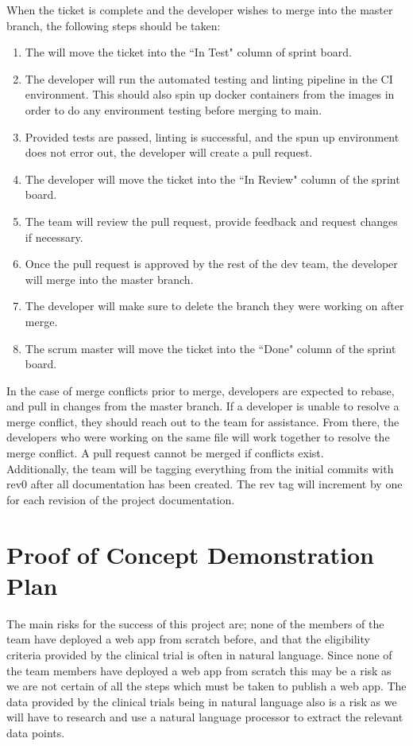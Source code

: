 \documentclass{article}
\begin{document}
When the ticket is complete and the developer wishes to merge into the master branch, the following steps should be taken:
\begin{enumerate}
	\item The will move the ticket into the ``In Test" column of sprint board.
	\item The developer will run the automated testing and linting pipeline in the CI environment.
	This should also spin up docker containers from the images in order to do any environment testing before merging to main.
	\item Provided tests are passed, linting is successful, and the spun up environment does not error out, the developer will create a pull request.
	\item The developer will move the ticket into the ``In Review" column of the sprint board.
	\item The team will review the pull request, provide feedback and request changes if necessary. 
	\item Once the pull request is approved by the rest of the dev team, the developer will merge into the master branch.
	\item The developer will make sure to delete the branch they were working on after merge.
	\item The scrum master will move the ticket into the ``Done" column of the sprint board.
\end{enumerate}

In the case of merge conflicts prior to merge, developers are expected to rebase, and pull in changes from the master branch.
If a developer is unable to resolve a merge conflict, they should reach out to the team for assistance. 
From there, the developers who were working on the same file will work together to resolve the merge conflict. 
A pull request cannot be merged if conflicts exist.\\

Additionally, the team will be tagging everything from the initial commits with rev0 after all documentation has been created. 
The rev tag will increment by one for each revision of the project documentation. \\
\section{Proof of Concept Demonstration Plan}

The main risks for the success of this project are; none of the members of the team have deployed a web app from scratch before, and that the eligibility criteria provided by the clinical trial is often in natural language. Since none of the team members have deployed a web app from scratch this may be a risk as we are not certain of all the steps which must be taken to publish a web app. The data provided by the clinical trials being in natural language also is a risk as we will have to research and use a natural language processor to extract the relevant data points. 
\end{document}
